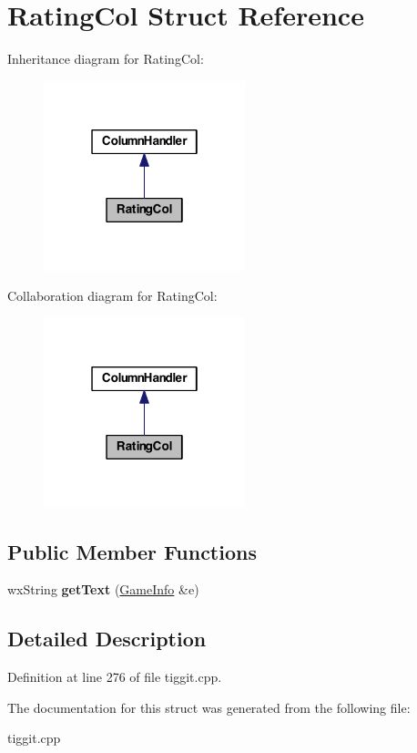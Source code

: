\hypertarget{struct_rating_col}{\section{Rating\-Col Struct Reference}
\label{struct_rating_col}
}


Inheritance diagram for Rating\-Col\-:
\nopagebreak
\begin{figure}[H]
\begin{center}
\leavevmode
\includegraphics[width=166pt]{struct_rating_col__inherit__graph}
\end{center}
\end{figure}


Collaboration diagram for Rating\-Col\-:
\nopagebreak
\begin{figure}[H]
\begin{center}
\leavevmode
\includegraphics[width=166pt]{struct_rating_col__coll__graph}
\end{center}
\end{figure}
\subsection*{Public Member Functions}
\begin{DoxyCompactItemize}
\item 
\hypertarget{struct_rating_col_a4515abb05881ab3f67dbeeb58765de22}{wx\-String {\bfseries get\-Text} (\hyperlink{struct_game_info}{Game\-Info} \&e)}\label{struct_rating_col_a4515abb05881ab3f67dbeeb58765de22}

\end{DoxyCompactItemize}


\subsection{Detailed Description}


Definition at line 276 of file tiggit.\-cpp.



The documentation for this struct was generated from the following file\-:\begin{DoxyCompactItemize}
\item 
tiggit.\-cpp\end{DoxyCompactItemize}
